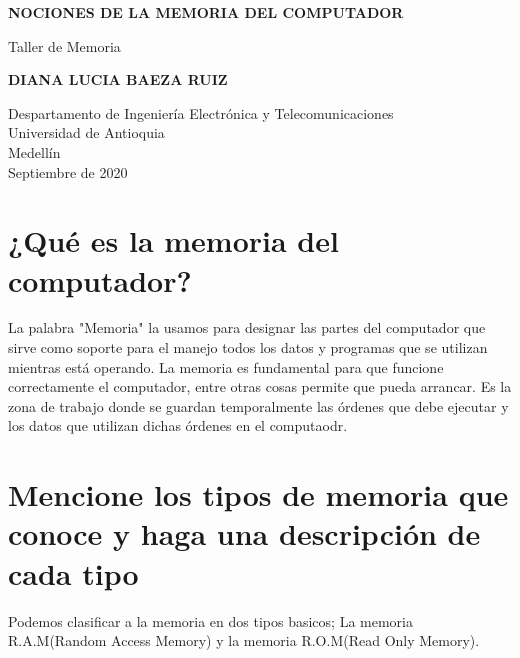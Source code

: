 \documentclass{article}
\begin{document}
\begin{titlepage}
    \begin{center}
        \vspace*{1cm}
            
        \Huge
        \textbf{NOCIONES DE LA MEMORIA DEL COMPUTADOR}
            
        \vspace{0.5cm}
        \LARGE
        Taller de Memoria
            
        \vspace{1.5cm}
            
        \textbf{DIANA LUCIA BAEZA RUIZ}
            
        \vfill
            
        \vspace{0.8cm}
            
        \Large
        Despartamento de Ingeniería Electrónica y Telecomunicaciones\\
        Universidad de Antioquia\\
        Medellín\\
        Septiembre de 2020
            
    \end{center}
\end{titlepage}

\tableofcontents
\newpage

\section{¿Qué es la memoria del computador?} \label{contenido}

La palabra "Memoria" la usamos para designar las partes del computador que sirve como soporte para el manejo todos los datos y programas que se utilizan mientras está operando. La memoria es fundamental para que funcione correctamente el computador, entre otras cosas permite que pueda arrancar.
Es la zona de trabajo donde se guardan temporalmente las órdenes que debe ejecutar y los datos que utilizan dichas órdenes en el computaodr.\cite{1website}

\section{Mencione los tipos de memoria que conoce y haga una descripción de cada tipo}

Podemos clasificar a la memoria en dos tipos basicos; La memoria R.A.M(Random Access Memory) y la memoria R.O.M(Read Only Memory).
\end{document}
